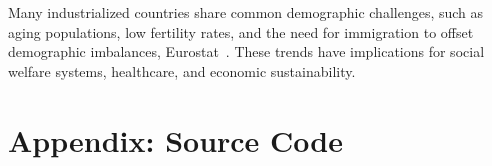 \documentclass[a4paper]{article}
\begin{document}
Many industrialized countries share common demographic challenges, such as aging populations, low fertility rates, and the need for immigration to offset demographic imbalances, Eurostat~\cite{Eurostat:2023}. 
These trends have implications for social welfare systems, healthcare, and economic sustainability. 

\newpage

\printbibliography

\section*{Appendix: Source Code}




\end{document}
